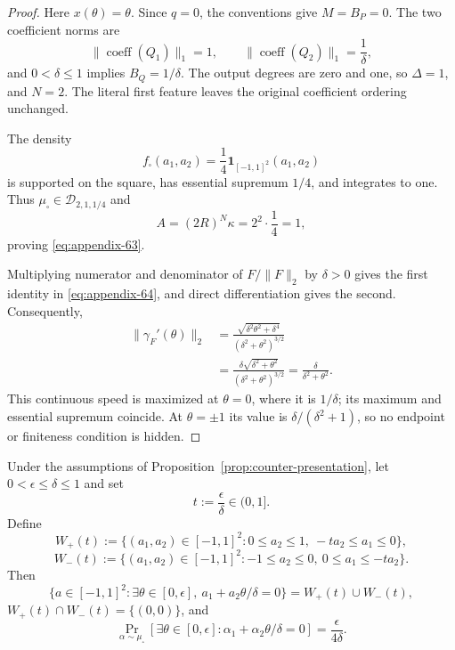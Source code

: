 \begin{proof}
Here $x(\theta)=\theta$.  Since $q=0$, the conventions give
$M=B_P=0$.  The two coefficient norms are
\[
\|\operatorname{coeff}(Q_1)\|_1=1,
\qquad
\|\operatorname{coeff}(Q_2)\|_1=\frac1\delta,
\]
and $0<\delta\leq1$ implies $B_Q=1/\delta$.  The output degrees are zero
and one, so $\Delta=1$, and $N=2$.  The literal first feature leaves the
original coefficient ordering unchanged.

The density
\[
f_\square(a_1,a_2)
=\frac14\mathbf1_{[-1,1]^2}(a_1,a_2)
\]
is supported on the square, has essential supremum $1/4$, and integrates to
one.  Thus $\mu_\square\in\mathcal D_{2,1,1/4}$ and
\[
A=(2R)^N\kappa=2^2\cdot\frac14=1,
\]
proving \eqref{eq:appendix-63}.

Multiplying numerator and denominator of $F/\|F\|_2$ by $\delta>0$ gives
the first identity in \eqref{eq:appendix-64}, and direct differentiation gives the second.
Consequently,
\[
\begin{aligned}
\|\gamma_F'(\theta)\|_2
&=\frac{\sqrt{\delta^2\theta^2+\delta^4}}
        {(\delta^2+\theta^2)^{3/2}}\\
&=\frac{\delta\sqrt{\delta^2+\theta^2}}
        {(\delta^2+\theta^2)^{3/2}}
=\frac{\delta}{\delta^2+\theta^2}.
\end{aligned}
\]
This continuous speed is maximized at $\theta=0$, where it is $1/\delta$;
its maximum and essential supremum coincide.  At $\theta=\pm1$ its value is
$\delta/(\delta^2+1)$, so no endpoint or finiteness condition is hidden.
\end{proof}

\begin{lemma}
\label{lem:counter-wedges}
Under the assumptions of Proposition~\ref{prop:counter-presentation}, let
$0<\epsilon\leq\delta\leq1$ and set
\[
t:=\frac\epsilon\delta\in(0,1].
\]
Define
\begin{equation}
W_+(t):=\{(a_1,a_2)\in[-1,1]^2:
0\leq a_2\leq1,\ -ta_2\leq a_1\leq0\},
\label{eq:appendix-66}
\end{equation}
\begin{equation}
W_-(t):=\{(a_1,a_2)\in[-1,1]^2:
-1\leq a_2\leq0,\ 0\leq a_1\leq-ta_2\}.
\label{eq:appendix-67}
\end{equation}
Then
\begin{equation}
\{a\in[-1,1]^2:\exists\theta\in[0,\epsilon],
 \ a_1+a_2\theta/\delta=0\}
=W_+(t)\cup W_-(t),
\label{eq:appendix-68}
\end{equation}
$W_+(t)\cap W_-(t)=\{(0,0)\}$, and
\begin{equation}
\Pr_{\alpha\sim\mu_\square}
[\exists\theta\in[0,\epsilon]:
 \alpha_1+\alpha_2\theta/\delta=0]
=\frac{\epsilon}{4\delta}.
\label{eq:appendix-69}
\end{equation}
\end{lemma}

